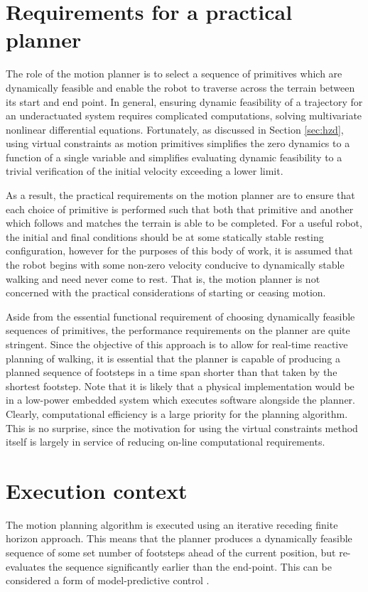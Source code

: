 \section{Requirements for a practical planner}
The role of the motion planner is to select a sequence of primitives which are dynamically feasible and enable the robot to traverse across the terrain between its start and end point. In general, ensuring dynamic feasibility of a trajectory for an underactuated system requires complicated computations, solving multivariate nonlinear differential equations. Fortunately, as discussed in Section \ref{sec:hzd}, using virtual constraints as motion primitives simplifies the zero dynamics to a function of a single variable and simplifies evaluating dynamic feasibility to a trivial verification of the initial velocity exceeding a lower limit.

As a result, the practical requirements on the motion planner are to ensure that each choice of primitive is performed such that both that primitive and another which follows and matches the terrain is able to be completed. For a useful robot, the initial and final conditions should be at some statically stable resting configuration, however for the purposes of this body of work, it is assumed that the robot begins with some non-zero velocity conducive to dynamically stable walking and need never come to rest. That is, the motion planner is not concerned with the practical considerations of starting or ceasing motion.

Aside from the essential functional requirement of choosing dynamically feasible sequences of primitives, the performance requirements on the planner are quite stringent. Since the objective of this approach is to allow for real-time reactive planning of walking, it is essential that the planner is capable of producing a planned sequence of footsteps in a time span shorter than that taken by the shortest footstep. Note that it is likely that a physical implementation would be in a low-power embedded system which executes software alongside the planner. Clearly, computational efficiency is a large priority for the planning algorithm. This is no surprise, since the motivation for using the virtual constraints method itself is largely in service of reducing on-line computational requirements.

\section{Execution context}
The motion planning algorithm is executed using an iterative receding finite horizon approach. This means that the planner produces a dynamically feasible sequence of some set number of footsteps ahead of the current position, but re-evaluates the sequence significantly earlier than the end-point. This can be considered a form of model-predictive control \cite{camacho2013model}.

